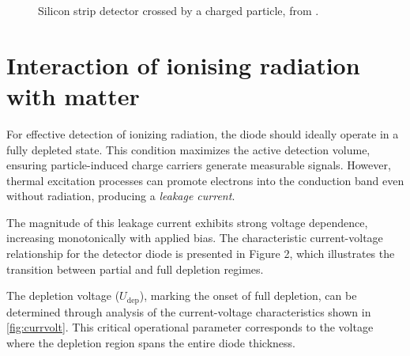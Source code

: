 \begin{figure}[H]
	\centering
	\caption{Silicon strip detector crossed by a charged particle, from \cite{allport}.}
	\label{fig:ionization}
\end{figure}
\section{Interaction of ionising radiation with matter}

For effective detection of ionizing radiation, the diode should ideally operate in a fully depleted state. This condition maximizes the active detection volume, ensuring particle-induced charge carriers generate measurable signals. However, thermal excitation processes can promote electrons into the conduction band even without radiation, producing a \textit{leakage current}. 

The magnitude of this leakage current exhibits strong voltage dependence, increasing monotonically with applied bias. The characteristic current-voltage relationship for the detector diode is presented in Figure 2, which illustrates the transition between partial and full depletion regimes.

The depletion voltage ($U_{\mathrm{dep}}$), marking the onset of full depletion, can be determined through analysis of the current-voltage characteristics shown in \autoref{fig:currvolt}. This critical operational parameter corresponds to the voltage where the depletion region spans the entire diode thickness.

